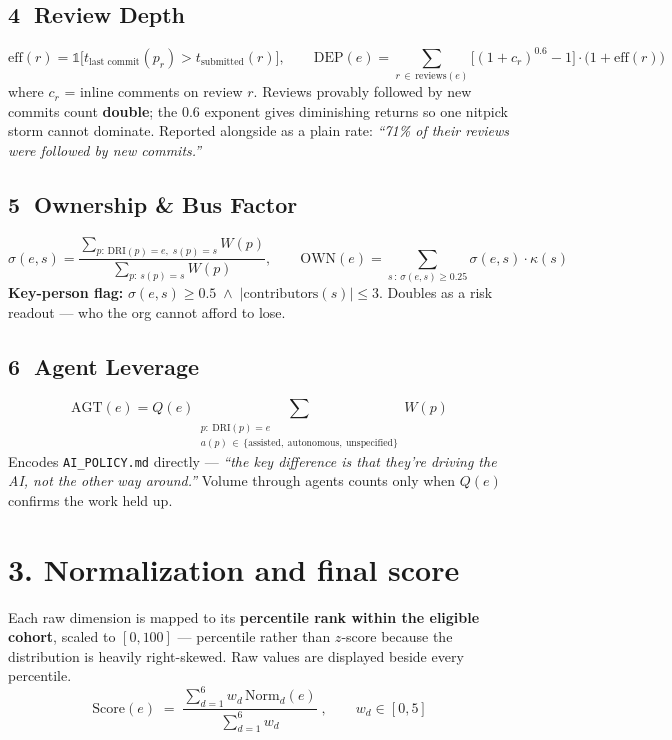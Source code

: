 \documentclass[11pt]{article}
\begin{document}
\subsection*{\textcircled{4} Review Depth}
\[
\mathrm{eff}(r)=\mathbb{1}\big[t_{\text{last commit}}(p_r) > t_{\text{submitted}}(r)\big],\qquad
\mathrm{DEP}(e)=\sum_{r\,\in\,\mathrm{reviews}(e)}\Big[(1+c_r)^{0.6}-1\Big]\cdot\big(1+\mathrm{eff}(r)\big)
\]
where $c_r$ = inline comments on review $r$. Reviews provably followed by new commits count
\textbf{double}; the $0.6$ exponent gives diminishing returns so one nitpick storm cannot dominate.
Reported alongside as a plain rate: \emph{``71\% of their reviews were followed by new commits.''}

\subsection*{\textcircled{5} Ownership \& Bus Factor}
\[
\sigma(e,s)=\frac{\sum_{p:\,\mathrm{DRI}(p)=e,\;s(p)=s} W(p)}{\sum_{p:\,s(p)=s} W(p)},
\qquad
\mathrm{OWN}(e)=\sum_{s\,:\,\sigma(e,s)\ge 0.25}\sigma(e,s)\cdot\kappa(s)
\]
\textbf{Key-person flag:} $\sigma(e,s)\ge 0.5 \;\wedge\; |\text{contributors}(s)|\le 3$.
Doubles as a risk readout --- who the org cannot afford to lose.

\subsection*{\textcircled{6} Agent Leverage}
\[ \mathrm{AGT}(e)=Q(e)\sum_{\substack{p:\ \mathrm{DRI}(p)=e\\ a(p)\,\in\,\{\text{assisted},\ \text{autonomous},\ \text{unspecified}\}}} W(p) \]
Encodes \texttt{AI\_POLICY.md} directly --- \emph{``the key difference is that they're driving the AI,
not the other way around.''} Volume through agents counts only when $Q(e)$ confirms the work held up.

\section*{3. Normalization and final score}
Each raw dimension is mapped to its \textbf{percentile rank within the eligible cohort}, scaled to
$[0,100]$ --- percentile rather than $z$-score because the distribution is heavily right-skewed.
Raw values are displayed beside every percentile.
\[ \boxed{\;\mathrm{Score}(e)\;=\;\frac{\sum_{d=1}^{6} w_d\,\mathrm{Norm}_d(e)}{\sum_{d=1}^{6} w_d}\;,\qquad w_d\in[0,5]\;} \]
\end{document}
